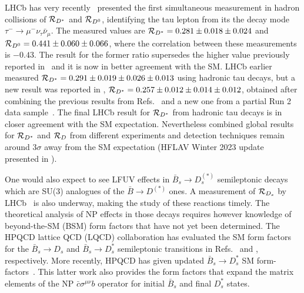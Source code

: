 \documentclass[aps,superscriptaddress,showpacs,nofootinbib,11pt]{revtex4-1}
\begin{document}
LHCb has very recently~\cite{LHCb:2023zxo} presented the
first simultaneous measurement in hadron collisions of ${\cal R}_{D^*}$ and ${\cal R}_{D^0}$, identifying the tau lepton from its the decay mode $\tau^-\to \mu^-\nu_\tau\bar\nu_\mu$. The measured values
are ${\cal R}_{D^*}=0.281\pm 0.018\pm 0.024$ and ${\cal R}_{D^0}=0.441\pm 0.060\pm 0.066$, where the correlation between
these measurements is $-0.43$. The result for the former ratio supersedes the higher value previously reported in~\cite{LHCb:2015gmp} and it is now in better agreement with the SM. LHCb earlier measured ${\cal R}_{D^*}= 0.291 \pm 0.019 \pm  0.026 \pm  0.013$ \cite{LHCb:2017smo,LHCb:2017rln} using hadronic tau decays, but a new result was reported in \cite{LHCb:2023cjr}, ${\cal R}_{D^*}=0.257 \pm 0.012 \pm  0.014 \pm  0.012$, obtained after combining the previous results from  Refs.~\cite{LHCb:2017smo,LHCb:2017rln} and a new one from a partial Run 2 data sample~\cite{LHCb:2023cjr}. The final LHCb result  for ${\cal R}_{D^*}$ from hadronic tau decays is in closer agreement with the SM expectation.  Nevertheless combined global results for ${\cal R}_{D^*}$ and ${\cal R}_{D}$ from different experiments and detection techniques remain around $3\sigma$ away from the SM expectation (HFLAV Winter 2023 update~\cite{HFLAV:2022pwe} presented in \cite{LHCbseminar}).
 


One would also expect to see LFUV effects in  $\bar B_s\to D_s^{(*)}$ semileptonic decays which are SU(3) analogues of the $\bar B\to D^{(*)}$ ones. A measurement of ${\cal R}_{D_s}$ by LHCb~\cite{LHCbseminar} is also underway, making the study of these reactions timely. The theoretical analysis of NP effects in those decays requires however knowledge of beyond-the-SM (BSM) form factors that have not   yet been determined. The HPQCD lattice QCD (LQCD) collaboration has evaluated the SM form factors for the $\bar B_s\to D_s$ and $\bar B_s\to D_s^{*}$ semileptonic transitions in Refs.~\cite{McLean:2019qcx} and \cite{Harrison:2021tol}, respectively. More recently, HPQCD  has given  updated  $\bar B_s\to D_s^*$  SM form-factors~\cite{Harrison:2023dzh}. This latter work also provides the form factors that expand the matrix elements  of the NP $\bar c \sigma^{\mu\nu} b$  operator for initial $\bar B_s$ and final $D_s^*$ states.
\end{document}
